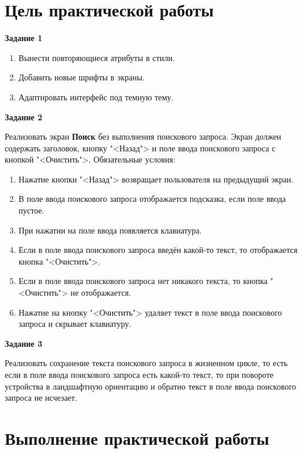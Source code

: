 \section*{\LARGE Цель практической работы}

\textbf{Задание 1}

\begin{enumerate}
	\item Вынести повторяющиеся атрибуты в стили.
	\item Добавить новые шрифты в экраны.
	\item Адаптировать интерфейс под темную тему.
\end{enumerate}

\textbf{Задание 2}

Реализовать экран \textbf{Поиск} без выполнения поискового запроса.
Экран должен содержать заголовок, кнопку "<Назад"> и поле ввода поискового
запроса с кнопкой "<Очистить">.
Обязательные условия:

\begin{enumerate}
	\item Нажатие кнопки "<Назад"> возвращает пользователя на предыдущий экран.
	\item В поле ввода поискового запроса отображается подсказка, если поле
		ввода пустое.
	\item При нажатии на поле ввода появляется клавиатура.
	\item Если в поле ввода поискового запроса введён какой-то текст, то
		отображается кнопка "<Очистить">.
	\item Если в поле ввода поискового запроса нет никакого текста, то кнопка
		"<Очистить"> не отображается.
	\item Нажатие на кнопку "<Очистить"> удаляет текст в поле ввода поискового
		запроса и скрывает клавиатуру.
\end{enumerate}

\textbf{Задание 3}

Реализовать сохранение текста поискового запроса в жизненном цикле, то
есть если в поле ввода поискового запроса есть какой-то текст, то при
повороте устройства в ландшафтную ориентацию и обратно текст в поле
ввода поискового запроса не исчезает.

\clearpage

\section*{\LARGE Выполнение практической работы}


